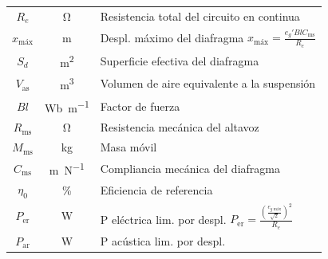 \documentclass[a4paper, 8pt]{extarticle}
\begin{document}
\begin{multicols}{3}
\begin{center}
\begin{tabular}{|c|c|l|}
            \hline
            $R_e$              & \unit{\ohm}             & Resistencia total del circuito en continua                                                                                                                    \\
            $x_{\text{máx}}$   & \unit{\meter}           & Despl. máximo del diafragma $x_{\text{máx}} = \frac{e_g' Bl C _{\text{ms}}}{R_e}$                                                                             \\
            $S_d$              & \unit{\meter^2}         & Superficie efectiva del diafragma                                                                                                                             \\
            $V _{\text{as}}$   & \unit{\meter^3}         & Volumen de aire equivalente a la suspensión                                                                                                                   \\
            $Bl$               & \unit{\weber\per\metre} & Factor de fuerza                                                                                                                                              \\

            \hline
            $R _{\text{ms}}$   & \unit{\ohm}             & Resistencia mecánica del altavoz                                                                                                                              \\
            $M _{\text{ms}}$   & \unit{\kg}              & Masa móvil                                                                                                                                                    \\
            $C _{\text{ms}}$   & \unit{\meter \per \N}   & Compliancia mecánica del diafragma                                                                                                                            \\

            \hline
            $\eta _0$          & \%                      & Eficiencia de referencia                                                                                                                                      \\
            $P _{\text{er}}$   & \unit{\watt}            & P eléctrica lim. por despl.                                                $P _{\text{er}} = \frac{\left( \frac{e_{g \text{ máx}}}{\sqrt{2}} \right)^2}{R_e}$ \\
            $P _{\text{ar}}$   & \unit{\watt}            & P acústica lim. por despl.                                                                                                                                    \\


\end{tabular}
\end{center}
\end{multicols}
\end{document}
